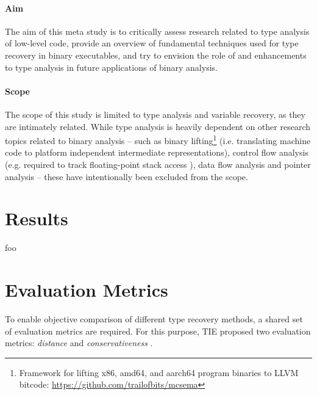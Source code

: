 \documentclass[10pt, a4paper, sigplan, authordraft]{acmart}
\begin{document}
\paragraph{Aim} The aim of this meta study is to critically assess research related to type analysis of low-level code, provide an overview of fundamental techniques used for type recovery in binary executables, and try to envision the role of and enhancements to type analysis in future applications of binary analysis.

\paragraph{Scope} The scope of this study is limited to type analysis and variable recovery, as they are intimately related. While type analysis is heavily dependent on other research topics related to binary analysis -- such as binary lifting\footnote{Framework for lifting x86, amd64, and aarch64 program binaries to LLVM bitcode: \url{https://github.com/trailofbits/mcsema}} (i.e. translating machine code to platform independent intermediate representations), control flow analysis (e.g. required to track floating-point stack access \cite{tie_reverse_engineering_of_types}), data flow analysis and pointer analysis -- these have intentionally been excluded from the scope.


\section{Results}



foo


\section{Evaluation Metrics}


To enable objective comparison of different type recovery methods, a shared set of evaluation metrics are required. For this purpose, TIE proposed two evaluation metrics: \textit{distance} and \textit{conservativeness} \cite{tie_reverse_engineering_of_types}.
\end{document}
